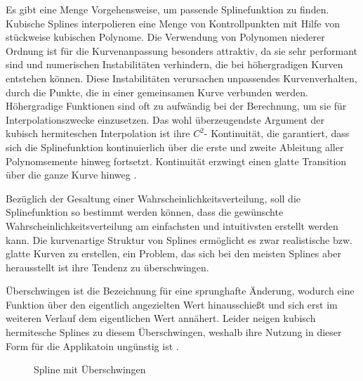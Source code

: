 Es gibt eine Menge Vorgehensweise, um passende Splinefunktion zu finden. 
Kubische Splines interpolieren eine Menge von Kontrollpunkten mit Hilfe von
stückweise kubischen Polynome. Die Verwendung von Polynomen niederer Ordnung ist für die Kurvenanpassung besonders attraktiv, da sie sehr performant sind und numerischen Instabilitäten verhindern, die bei höhergradigen Kurven entstehen können. Diese Instabilitäten verursachen unpassendes Kurvenverhalten, durch die Punkte, die in einer gemeinsamen Kurve verbunden werden. Höhergradige Funktionen sind oft zu aufwändig bei der Berechnung, um sie für Interpolationszwecke einzusetzen. Das wohl überzeugendste
Argument der kubisch hermiteschen Interpolation ist ihre $C^2$-
Kontinuität, die garantiert, dass sich die Splinefunktion kontinuierlich über die erste und zweite Ableitung aller Polynomsemente hinweg fortsetzt.
Kontinuität erzwingt einen glatte Transition über die ganze Kurve hinweg \cite{Wolberg1999}.

Bezüglich der Gesaltung einer Wahrscheinlichkeitsverteilung, soll die Splinefunktion so bestimmt werden können, dass die gewünschte Wahrscheinlichkeitsverteilung am einfachsten und intuitivsten erstellt werden kann. Die kurvenartige Struktur von Splines ermöglicht es zwar realistische bzw. glatte Kurven zu erstellen, ein Problem, das sich bei den meisten Splines aber herausstellt ist ihre Tendenz zu überschwingen. 

Überschwingen ist die Bezeichnung für eine sprunghafte Änderung, wodurch eine Funktion über den eigentlich angezielten Wert hinausschießt und sich erst im weiteren Verlauf dem eigentlichen Wert annähert. Leider neigen kubisch hermitesche Splines zu diesem Überschwingen, weshalb ihre Nutzung in dieser Form für die Applikatoin ungünstig ist \cite{kruger:2007}.

\begin{figure}[H]
    \center
    \caption{Spline mit Überschwingen}\label{fig:spline}
\end{figure}

